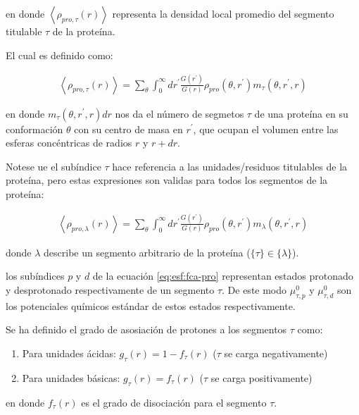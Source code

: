 \noindent en donde $\left<\rho_{pro,\tau}(r)\right>$ representa la densidad local promedio del segmento titulable $\tau$ de la prote\'ina.

El cual es definido como:


\begin{align}
	\left<\rho_{pro,\tau}(r)\right> = \sum_\theta \int_0^\infty dr^\prime \frac{G(r^\prime)}{G(r)} \rho_{pro}(\theta,r^\prime)m_\tau(\theta,r^\prime,r)
	\label{eq:esf:segments-pro-vector}
\end{align}


\noindent en donde $m_\tau(\theta,r^\prime,r) dr$  nos da el n\'umero de segmetos $\tau$  de una prote\'ina en su conformaci\'on $\theta$ con su centro de masa en $r^\prime$, que ocupan el volumen entre las esferas conc\'entricas de radios $r$ y $r + dr$.



Notese ue el sub\'indice  $\tau$ hace referencia a las unidades/residuos titulables de la prote\'ina, pero estas expresiones son validas para todos los segmentos de la prote\'ina:

\begin{align}
	\left<\rho_{pro,\lambda}(r)\right> = \sum_\theta \int_0^\infty dr^\prime \frac{G(r^\prime)}{G(r)} \rho_{pro}(\theta,r^\prime)m_\lambda(\theta,r^\prime,r)
	\label{eq:esf:segments-pro}
\end{align}



\noindent donde $\lambda$  describe un segmento arbitrario de la prote\'ina ($\{\tau\}\in\{\lambda\}$).

los sub\'indices $p$ y $d$  de la ecuaci\'on \ref{eq:esf:fca-pro} representan estados protonado y desprotonado respectivamente de un segmento $\tau$. 
De este modo $\mu^0_{\tau,p}$ y $\mu^0_{\tau,d}$  son los potenciales qu\'imicos est\'andar de estos estados respectivamente.

Se ha definido el grado de asosiaci\'on de protones a los segmentos $\tau$
como: 
 
\begin{enumerate}
	\item Para unidades \'acidas: $g_\tau(r) = 1-f_\tau(r)$ ($\tau$ se carga negativamente)
	\item Para unidades b\'asicas: $g_\tau(r) = f_\tau(r)$ ($\tau$ se carga positivamente)
\end{enumerate}
\noindent en donde $f_\tau(r)$  es el grado de disociaci\'on  para el segmento $\tau$.

